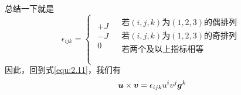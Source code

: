 总结一下就是
\begin{equation}\label{equ:2.13}
    \epsilon _{ijk}=\left\{ \begin{matrix}
        \begin{array}{c}
        +J\\
        -J\\
        0\\
    \end{array}&		\begin{array}{l}
        \text{若}\left( i,j,k \right) \text{为}\left( 1,2,3 \right) \text{的偶排列}\\
        \text{若}\left( i,j,k \right) \text{为}\left( 1,2,3 \right) \text{的奇排列}\\
        \text{若两个及以上指标相等}\\
    \end{array}\\
    \end{matrix} \right.  
\end{equation}
因此，回到式\eqref{equ:2.11}，我们有
\begin{equation}\label{equ:2.14}
    \boldsymbol{u}\times \boldsymbol{v}=\epsilon _{ijk}u^iv^j\boldsymbol{g}^k
\end{equation}

